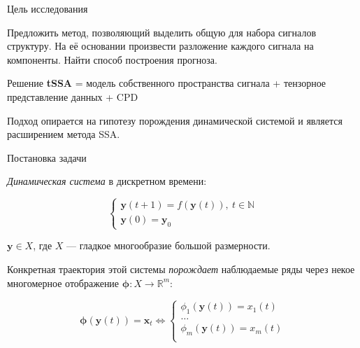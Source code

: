 	\begin{frame}{Цель исследования}
		
		Предложить метод, позволяющий выделить общую для набора сигналов структуру. На её основании произвести разложение каждого сигнала на компоненты. Найти способ построения прогноза.
		
		\begin{exampleblock}{Решение}
			\textbf{tSSA} = модель собственного пространства сигнала + тензорное представление данных + CPD
		\end{exampleblock}
		
		Подход опирается на гипотезу порождения динамической системой и является расширением метода SSA.
		
	\end{frame}
	
	\begin{frame}{Постановка задачи}
		
		\emph{Динамическая система} в дискретном времени:
		
		\begin{equation*}
			\begin{cases}
				\textbf{y}(t + 1) = f(\textbf{y}(t)), \ t \in \mathbb{N} \\
				\textbf{y}(0) = \textbf{y}_0
			\end{cases}
		\end{equation*}
		
		$ \textbf{y} \in X $, где $ X $ --- гладкое многообразие большой размерности. 
		
		Конкретная траектория этой системы \emph{порождает} наблюдаемые ряды через некое многомерное отображение $ \boldsymbol{\phi}: X \to \mathbb{R}^m $:
		
		\begin{equation*}
			\boldsymbol{\phi}(\textbf{y}(t)) = \textbf{x}_t \Leftrightarrow \begin{cases}
				\phi_1(\textbf{y}(t)) = x_1(t) \\
				\ldots \\
				\phi_m(\textbf{y}(t)) = x_m(t) \\
			\end{cases}
		\end{equation*}
		
	\end{frame}
	
